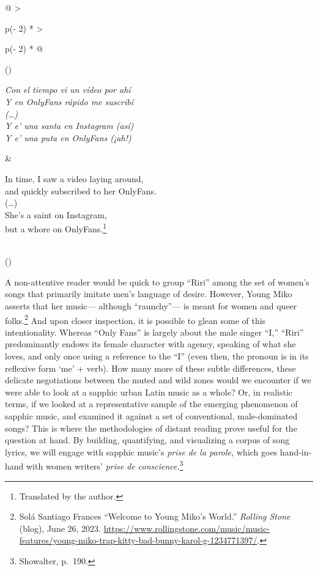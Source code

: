 \documentclass[
  letterpaper,
  DIV=11,
  numbers=noendperiod]{scrartcl}
\begin{document}
\begin{longtable}[]{@{}
  >{\raggedright\arraybackslash}p{(\columnwidth - 2\tabcolsep) * }
  >{\raggedright\arraybackslash}p{(\columnwidth - 2\tabcolsep) * }@{}}
\toprule()
\endhead
\begin{minipage}[t]{\linewidth}\raggedright
\emph{Con el tiempo vi un vídeo por ahí}\\
\emph{Y en OnlyFans rápido me suscribí}\\
\emph{(\ldots)}\\
\emph{Y e' una santa en Instagram (así)}\\
\emph{Y e' una puta en OnlyFans (¡ah!)}\strut
\end{minipage} & \begin{minipage}[t]{\linewidth}\raggedright
In time, I saw a video laying around,\\
and quickly subscribed to her OnlyFans.\\
(\ldots)\\
She's a saint on Instagram,\\
but a whore on OnlyFans.\footnote{Translated by the author.}\strut
\end{minipage} \\
\bottomrule()
\end{longtable}

A non-attentive reader would be quick to group ``Riri'' among the set of
women's songs that primarily imitate men's language of desire. However,
Young Miko asserts that her music--- although ``raunchy''--- is meant
for women and queer folks.\footnote{Solá Santiago Frances ``Welcome to
  Young Miko's World.'' \emph{Rolling Stone} (blog), June 26, 2023.
  \url{https://www.rollingstone.com/music/music-features/young-miko-trap-kitty-bad-bunny-karol-g-1234771397/}.}
And upon closer inspection, it is possible to glean some of this
intentionality. Whereas ``Only Fans'' is largely about the male singer
``I,'' ``Riri'' predominantly endows its female character with agency,
speaking of what she loves, and only once using a reference to the ``I''
(even then, the pronoun is in its reflexive form `me' + verb). How many
more of these subtle differences, these delicate negotiations between
the muted and wild zones would we encounter if we were able to look at a
sapphic urban Latin music as a whole? Or, in realistic terms, if we
looked at a representative sample of the emerging phenomenon of sapphic
music, and examined it against a set of conventional, male-dominated
songs? This is where the methodologies of distant reading prove useful
for the question at hand. By building, quantifying, and visualizing a
corpus of song lyrics, we will engage with sapphic music's \emph{prise
de la parole,} which goes hand-in-hand with women writers' \emph{prise
de conscience.}\footnote{Showalter, p.~190.}
\end{document}

